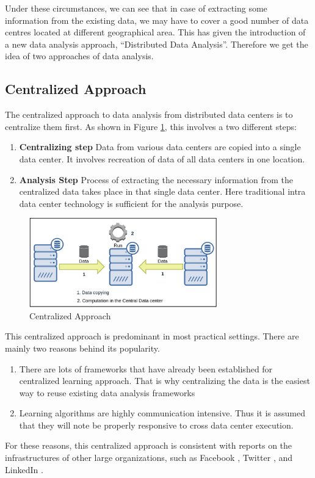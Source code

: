 \documentclass[10pt,conference,letterpaper]{IEEEtran}
\begin{document}
Under these circumstances, we can see that in case of extracting some information from the existing data, we may have to cover a good number of data centres located at different geographical area. This has given the introduction of a new data analysis approach, ``Distributed Data Analysis''. Therefore we get the idea of two approaches of data analysis.

\subsection{Centralized Approach}
The centralized approach to data analysis from distributed data centers is to centralize them first. As shown in Figure \ref{centralized}, this involves a two different steps: 


\begin{enumerate}

\item \textbf{Centralizing step} Data from various data centers are copied into a single data center. It involves recreation of data of all data centers in one location.

\item \textbf{Analysis Step} Process of extracting the necessary information from the centralized data takes place in that single data center. Here traditional intra data center technology is sufficient for the analysis purpose.

\end{enumerate}

\begin{center}
\begin{figure}[!htbp]
\includegraphics[width=3.2in]{1.png}
\caption{Centralized Approach}
\label{centralized}
\end{figure}
\end{center}

This centralized approach is predominant in most practical settings. 
There are mainly two reasons behind its popularity. 
\begin{enumerate}
\item There are lots of frameworks that have already been established for centralized learning approach. That is why centralizing the data is the easiest way to reuse existing data analysis frameworks \cite{1,2,3}
\item Learning algorithms are highly communication intensive. Thus it is assumed that they will note be properly responsive to cross data center execution.
\end{enumerate}
For these reasons, this centralized approach is consistent with reports on the infrastructures of other large organizations, such as Facebook \cite{4}, Twitter \cite{5}, and LinkedIn \cite{6}. 
\end{document}
